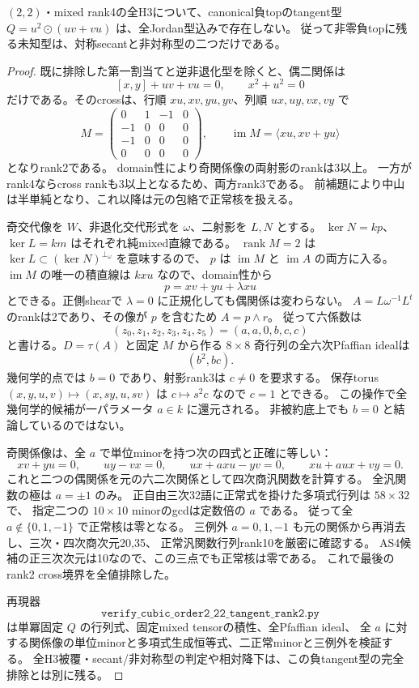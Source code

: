 \begin{theorem}\label{thm:h3-order2-22-negative-tangent-empty}
$(2,2)$・mixed rank4の全H3について、canonical負topのtangent型
$Q=u^2\odot(uv+vu)$ は、全Jordan型込みで存在しない。
従って非零負topに残る未知型は、対称secantと非対称型の二つだけである。
\end{theorem}
\begin{proof}
既に排除した第一割当てと逆非退化型を除くと、偶二関係は
\[
 [x,y]+uv+vu=0,\qquad x^2+u^2=0
\]
だけである。そのcrossは、行順 $xu,xv,yu,yv$、列順 $ux,uy,vx,vy$ で
\[
 M=\begin{pmatrix}0&1&-1&0\\-1&0&0&0\\-1&0&0&0\\0&0&0&0\end{pmatrix},
 \qquad\operatorname{im}M=\langle xu,xv+yu\rangle
\]
となりrank2である。
domain性により奇関係像の両射影のrankは3以上。
一方がrank4ならcross rankも3以上となるため、両方rank3である。
前補題により中山は半単純となり、これ以降は元の包絡で正常核を扱える。

奇交代像を $W$、非退化交代形式を $\omega$、二射影を $L,N$ とする。
$\ker N=kp$、$\ker L=km$ はそれぞれ純mixed直線である。
$\operatorname{rank}M=2$ は $\ker L\subset(\ker N)^{\perp_\omega}$ を意味するので、
$p$ は $\operatorname{im}M$ と $\operatorname{im}A$ の両方に入る。
$\operatorname{im}M$ の唯一の積直線は $kxu$ なので、domain性から
\[
 p=xv+yu+\lambda xu
\]
とできる。正側shearで $\lambda=0$ に正規化しても偶関係は変わらない。
$A=L\omega^{-1}L^t$ のrankは2であり、その像が $p$ を含むため $A=p\wedge r$。
従って六係数は
\[
 (z_0,z_1,z_2,z_3,z_4,z_5)=(a,a,0,b,c,c)
\]
と書ける。$D=\tau(A)$ と固定 $M$ から作る $8\times8$ 奇行列の全六次Pfaffian idealは
\[
 (b^2,bc).
\]
幾何学的点では $b=0$ であり、射影rank3は $c\ne0$ を要求する。
保存torus $(x,y,u,v)\mapsto(x,sy,u,sv)$ は $c\mapsto s^2c$ なので $c=1$ とできる。
この操作で全幾何学的候補が一パラメータ $a\in k$ に還元される。
非被約底上でも $b=0$ と結論しているのではない。

奇関係像は、全 $a$ で単位minorを持つ次の四式と正確に等しい：
\[
 xv+yu=0,\qquad uy-vx=0,\qquad
 ux+a xu-yv=0,\qquad xu+a ux+vy=0.
\]
これと二つの偶関係を元の六二次関係として四次商汎関数を計算する。
全汎関数の極は $a=\pm1$ のみ。
正自由三次32語に正常式を掛けた多項式行列は $58\times32$ で、
指定二つの $10\times10$ minorのgcdは定数倍の $a$ である。
従って全 $a\notin\{0,1,-1\}$ で正常核は零となる。
三例外 $a=0,1,-1$ も元の関係から再消去し、三次・四次商次元20,35、
正常汎関数行列rank10を厳密に確認する。
AS4候補の正三次次元は10なので、この三点でも正常核は零である。
これで最後のrank2 cross境界を全値排除した。

再現器
\[
\texttt{verify\_cubic\_order2\_22\_tangent\_rank2.py}
\]
は単冪固定 $Q$ の行列式、固定mixed tensorの積性、全Pfaffian ideal、
全 $a$ に対する関係像の単位minorと多項式生成恒等式、二正常minorと三例外を検証する。
全H3被覆・secant/非対称型の判定や相対降下は、この負tangent型の完全排除とは別に残る。
\end{proof}
